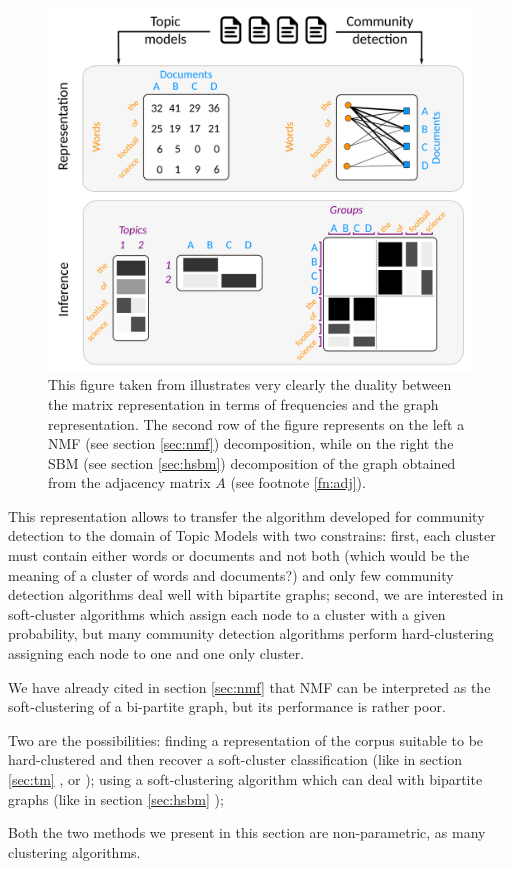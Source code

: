 \documentclass[11pt, a4paper, oneside, openright]{book}
\begin{document}
\begin{figure}[!bp]
	\centering
	\includegraphics[width=0.5\linewidth]{fig/hsbm}
	\caption{This figure taken from \textcite{gerlach2018} illustrates very clearly the duality between the matrix representation in terms of frequencies and the graph representation. The second row of the figure represents on the left a NMF (see section \ref{sec:nmf}) decomposition, while on the right the SBM (see section \ref{sec:hsbm}) decomposition of the graph obtained from the adjacency matrix $A$ (see footnote \ref{fn:adj}).}
	\label{fig:hsbm}
\end{figure}

This representation allows to transfer the algorithm developed for community detection to the domain of Topic Models with two constrains: first, each cluster must contain either words or documents and not both (which would be the meaning of a cluster of words and documents?) and only few community detection algorithms deal well with bipartite graphs; second, we are interested in soft-cluster algorithms which assign each node to a cluster with a given probability, but many community detection algorithms perform hard-clustering assigning each node to one and one only cluster.

We have already cited in section \ref{sec:nmf} that NMF can be interpreted as the soft-clustering of a bi-partite graph, but its performance is rather poor.

Two are the possibilities: finding a representation of the corpus suitable to be hard-clustered and then recover a soft-cluster classification (like in section \ref{sec:tm} \parencite{lancichinetti2015}, \cite{kido2016} or \cite{rao2021}); using a soft-clustering algorithm which can deal with bipartite graphs (like in section \ref{sec:hsbm} \parencite{gerlach2018}); 

Both the two methods we present in this section are non-parametric, as many clustering algorithms.
\end{document}
